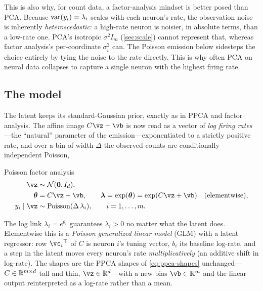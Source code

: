 \documentclass[11pt]{article}
\theoremstyle{plain}
\theoremstyle{definition}
\theoremstyle{remark}
\theoremstyle{definition}
\newcommand{\Normal}{\mathcal{N}}
\begin{document}
This is also why, for count data, a factor-analysis mindset is better posed than
PCA. Because $\operatorname*{var}(y_i) = \lambda_i$ scales with each neuron's rate, the
observation noise is inherently \emph{heteroscedastic}: a high-rate neuron is
noisier, in absolute terms, than a low-rate one. PCA's isotropic $\sigma^2 I_m$
(\cref{sec:scale}) cannot represent that, whereas factor analysis's
per-coordinate $\sigma_i^2$ can. The Poisson emission below sidesteps the choice
entirely by tying the noise to the rate directly.
This is why often PCA on neural data collapses to capture a single neuron with the highest firing rate.

\subsection{The model}

The latent keeps its standard-Gaussian prior, exactly as in PPCA and factor
analysis. The affine image $C\vz + \vb$ is now read as a vector of \emph{log
firing rates}---the ``natural'' parameter of the emission---exponentiated to a
strictly positive rate, and over a bin of width $\Delta$ the observed counts are
conditionally independent Poisson,
\begin{genmodel}{Poisson factor analysis}
\begin{align}
    \vz &\sim \Normal(\mathbf 0, I_d), \label{eq:expfam-latent}\\
    \bm{\theta} &= C\vz + \vb, \qquad \bm{\lambda} = \exp(\bm{\theta}) = \exp(C\vz + \vb)
        \quad\text{(elementwise)}, \label{eq:expfam-rate}\\
    y_i \mid \vz &\sim \mathrm{Poisson}(\Delta\,\lambda_i), \qquad i = 1, \dots, m . \label{eq:expfam-obs}
\end{align}
\end{genmodel}
The log link $\lambda_i = e^{\theta_i}$ guarantees $\lambda_i > 0$ no matter what
the latent does.
Elementwise this is a \emph{Poisson generalized linear model} (GLM) with a latent
regressor: row $\vc_i\trp$ of $C$ is neuron $i$'s tuning vector, $b_i$ its
baseline log-rate, and a step in the latent moves every neuron's rate
\emph{multiplicatively} (an additive shift in log-rate). The shapes are the PPCA
shapes of \eqref{eq:ppca-shapes} unchanged---$C \in \mathbb{R}^{m\times d}$ tall and
thin, $\vz \in \reals^d$---with a new bias $\vb \in \reals^m$ and the linear
output reinterpreted as a log-rate rather than a mean.
\end{document}
